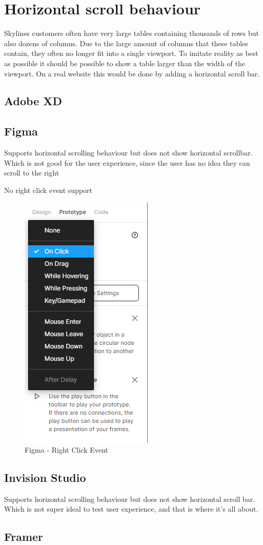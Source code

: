 \section{Horizontal scroll behaviour}
Skylines customers often have very large tables containing thousands of rows but also dozens of columns. Due to the large amount of columns that these tables contain, they often no longer fit into a single \gls{viewport}. To imitate reality as best as possible it should be possible to show a table larger than the width of the viewport. On a real website this would be done by adding a horizontal scroll bar.
    
\subsection{Adobe XD}
\subsection{Figma}
Supports horizontal scrolling behaviour
but does not show horizontal scrollbar. Which is not good for the user experience, since the user has no idea they can scroll to the right

No right click event support
\begin{figure}[h!]
\centering
\includegraphics[scale=0.2]{figures/figma/figma-right-click-event.png}
\caption{Figma - Right Click Event}
\label{fig:figma-right-click-event}
\end{figure}

\subsection{Invision Studio}
Supports horizontal scrolling behaviour 
but does not show horizontal scroll bar. Which is not super ideal to test user experience, and that is where it's all about.

\subsection{Framer}
